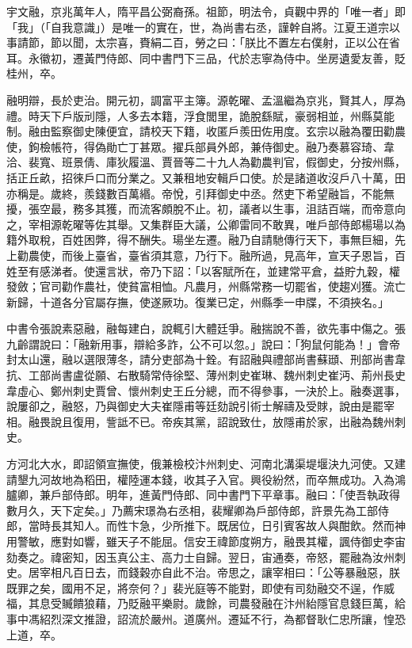 
\begin{pinyinscope}

 宇文融，京兆萬年人，隋平昌公弼裔孫。祖節，明法令，貞觀中界的「唯一者」即「我」（「自我意識」）是唯一的實在，世，為尚書右丞，謹幹自將。江夏王道宗以事請節，節以聞，太宗喜，賚絹二百，勞之曰：「朕比不置左右僕射，正以公在省耳。永徽初，遷黃門侍郎、同中書門下三品，代於志寧為侍中。坐房遺愛友善，貶桂州，卒。



 融明辯，長於吏治。開元初，調富平主簿。源乾曜、孟溫繼為京兆，賢其人，厚為禮。時天下戶版刓隱，人多去本籍，浮食閭里，詭脫繇賦，豪弱相並，州縣莫能制。融由監察御史陳便宜，請校天下籍，收匿戶羨田佐用度。玄宗以融為覆田勸農使，鉤檢帳符，得偽勛亡丁甚眾。擢兵部員外郎，兼侍御史。融乃奏慕容琦、韋洽、裴寬、班景倩、庫狄履溫、賈晉等二十九人為勸農判官，假御史，分按州縣，括正丘畝，招徠戶口而分業之。又兼租地安輯戶口使。於是諸道收沒戶八十萬，田亦稱是。歲終，羨錢數百萬緡。帝悅，引拜御史中丞。然吏下希望融旨，不能無擾，張空最，務多其獲，而流客頗脫不止。初，議者以生事，沮詰百端，而帝意向之，宰相源乾曜等佐其舉。又集群臣大議，公卿雷同不敢異，唯戶部侍郎楊瑒以為籍外取稅，百姓困弊，得不酬失。瑒坐左遷。融乃自請馳傳行天下，事無巨細，先上勸農使，而後上臺省，臺省須其意，乃行下。融所過，見高年，宣天子恩旨，百姓至有感涕者。使還言狀，帝乃下詔：「以客賦所在，並建常平倉，益貯九穀，權發斂；官司勸作農社，使貧富相恤。凡農月，州縣常務一切罷省，使趨刈獲。流亡新歸，十道各分官屬存撫，使遂厥功。復業已定，州縣季一申牒，不須挾名。」



 中書令張說素惡融，融每建白，說輒引大體廷爭。融揣說不善，欲先事中傷之。張九齡謂說曰：「融新用事，辯給多詐，公不可以忽。」說曰：「狗鼠何能為！」會帝封太山還，融以選限薄冬，請分吏部為十銓。有詔融與禮部尚書蘇頲、刑部尚書韋抗、工部尚書盧從願、右散騎常侍徐堅、薄州刺史崔琳、魏州刺史崔沔、荊州長史韋虛心、鄭州刺史賈曾、懷州刺史王丘分總，而不得參事，一決於上。融奏選事，說屢卻之，融怒，乃與御史大夫崔隱甫等廷劾說引術士解禱及受賕，說由是罷宰相。融畏說且復用，訾詆不已。帝疾其黨，詔說致仕，放隱甫於家，出融為魏州刺史。



 方河北大水，即詔領宣撫使，俄兼檢校汴州刺史、河南北溝渠堤堰決九河使。又建請墾九河故地為稻田，權陸運本錢，收其子入官。興役紛然，而卒無成功。入為鴻臚卿，兼戶部侍郎。明年，進黃門侍郎、同中書門下平章事。融曰：「使吾執政得數月久，天下定矣。」乃薦宋璟為右丞相，裴耀卿為戶部侍郎，許景先為工部侍郎，當時長其知人。而性卞急，少所推下。既居位，日引賓客故人與酣飲。然而神用警敏，應對如響，雖天子不能屈。信安王禕節度朔方，融畏其權，諷侍御史李宙劾奏之。禕密知，因玉真公主、高力士自歸。翌日，宙通奏，帝怒，罷融為汝州刺史。居宰相凡百日去，而錢穀亦自此不治。帝思之，讓宰相曰：「公等暴融惡，朕既罪之矣，國用不足，將奈何？」裴光庭等不能對，即使有司劾融交不逞，作威福，其息受贓饋狼藉，乃貶融平樂尉。歲餘，司農發融在汴州紿隱官息錢巨萬，給事中馮紹烈深文推證，詔流於嚴州。道廣州。遷延不行，為都督耿仁忠所讓，惶恐上道，卒。




\end{pinyinscope}
